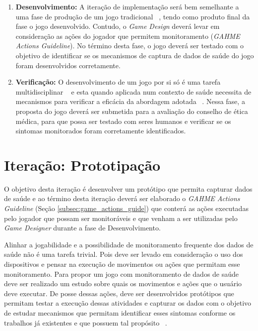 \begin{enumerate}
	\item \textbf{Desenvolvimento:} A iteração de implementação será bem semelhante a uma fase de produção de um jogo tradicional ~\cite{fullerton2008game}, tendo como produto final da fase o jogo desenvolvido. Contudo, o \textit{Game Design} deverá levar em consideração as ações do jogador que permitem monitoramento (\textit{GAHME Actions Guideline}). No término desta fase, o jogo deverá ser testado com o objetivo de identificar se os mecanismos de captura de dados de saúde do jogo foram desenvolvidos corretamente.
	\item \textbf{Verificação:} 	O desenvolvimento de um jogo por si só é uma tarefa multidisciplinar ~\cite{fullerton2008game} e esta quando aplicada num contexto de saúde necessita de mecanismos para verificar a eficácia da abordagem adotada ~\cite{kato12}. Nessa fase, a proposta do jogo deverá ser submetida para a avaliação do conselho de ética médica, para que possa ser testado com seres humanos e verificar se os sintomas monitorados foram corretamente identificados.
\end{enumerate}


\section{Iteração: Prototipação}
O objetivo desta iteração é desenvolver um protótipo que permita capturar dados de saúde e ao término desta iteração deverá ser elaborado o \textit{GAHME Actions Guideline} (Seção \ref{subsec:game_actions_guide}) que conterá as ações executadas pelo jogador que possam ser monitoráveis e que venham a ser utilizadas pelo \textit{Game Designer} durante a fase de Desenvolvimento. 

Alinhar a jogabilidade e a possibilidade de monitoramento frequente dos dados de saúde não é uma tarefa trivial. Pois deve ser levado em consideração o uso dos dispositivos e pensar na execução de movimentos ou ações que permitam esse monitoramento. Para propor um jogo com monitoramento de dados de saúde deve ser realizado um estudo sobre quais os movimentos e ações que o usuário deve executar. De posse dessas ações, deve ser desenvolvidos protótipos que permitam testar a execução dessas atividades e capturar os dados com o objetivo de estudar mecanismos que permitam identificar esses sintomas conforme os trabalhos já existentes e que possuem tal propósito ~\cite{Ballegaard:2008:HEL:1357054.1357336,albanese2012,bachlin_wearable_2010,visionbased2009,patel_monitoring_2009}. 

